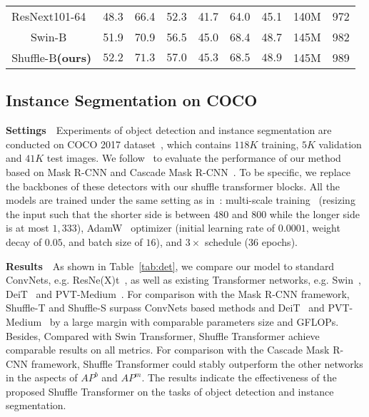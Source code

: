 \documentclass{article}
\begin{document}
\begin{table}
\begin{center}
{\begin{tabular}{c | c c c | c c c | c c}
\hline
ResNext101-64~\cite{xie2017aggregated} & 48.3 & 66.4 & 52.3 & 41.7 & 64.0 & 45.1 & 140M & 972 \\  Swin-B~\cite{liu2021Swin} & 51.9 & 70.9 & 56.5 & 45.0 & 68.4 & 48.7 & 145M & 982 \\  Shuffle-B\textbf{(ours)} & $\mathbf{52.2}$ & $\mathbf{71.3}$ & $\mathbf{57.0}$ & $\mathbf{45.3}$ & $\mathbf{68.5}$ & $\mathbf{48.9}$ & 145M & 989 \\
\bottomrule
\end{tabular}
}
\end{center}
\vspace{-0mm}
\end{table}


\subsection{Instance Segmentation on COCO}
\textbf{Settings}~~Experiments of object detection and instance segmentation are conducted on COCO 2017 dataset~\cite{lin2014microsoft}, which contains $118K$ training, $5K$ validation and $41K$ test images. We follow~\cite{liu2021Swin} to evaluate the performance of our method based on Mask R-CNN and Cascade Mask R-CNN~\cite{he2017mask,cai2018cascade}. To be specific, we replace the backbones of these detectors with our shuffle transformer blocks. All the models are trained under the same setting as in~\cite{liu2021Swin}: multi-scale training~\cite{carion2020end,sun2020sparse} (resizing the input such that the shorter side is between $480$ and $800$ while the longer side is at most $1,333$), AdamW~\cite{loshchilov2017decoupled} optimizer (initial learning rate of $0.0001$, weight decay of $0.05$, and batch size of $16$), and $3\times$ schedule ($36$ epochs).

\textbf{Results}~~As shown in Table~\ref{tab:det}, we compare our model to standard ConvNets, e.g. ResNe(X)t~\cite{xie2017aggregated}, as well as existing Transformer networks, e.g. Swin~\cite{liu2021Swin}, DeiT~\cite{touvron2020deit} and PVT-Medium~\cite{wang2021pyramid}. For comparison with the Mask R-CNN framework, Shuffle-T and Shuffle-S surpass ConvNets based methods and DeiT~\cite{touvron2020deit} and PVT-Medium~\cite{wang2021pyramid} by a large margin with comparable parameters size and GFLOPs. Besides, Compared with Swin Transformer, Shuffle Transformer achieve comparable results on all metrics. For comparison with the Cascade Mask R-CNN framework, Shuffle Transformer could stably outperform the other networks in the aspects of $AP^{b}$ and $AP^{m}$. The results indicate the effectiveness of the proposed Shuffle Transformer on the tasks of object detection and instance segmentation. 
\end{document}

